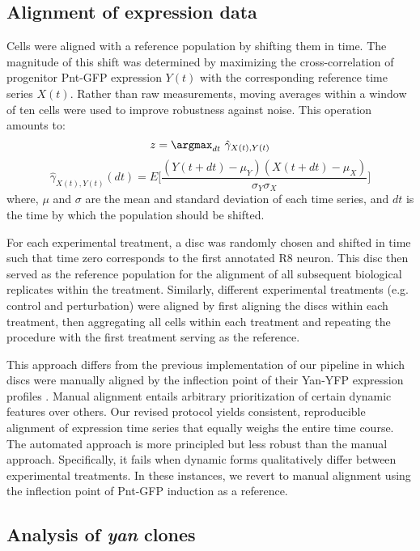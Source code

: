 \subsection{Alignment of expression data}
\label{appendix:methods:ratio:alignment}

Cells were aligned with a reference population by shifting them in time. The magnitude of this shift was determined by maximizing the cross-correlation of progenitor Pnt-GFP expression $Y(t)$ with the corresponding reference time series $X(t)$. Rather than raw measurements, moving averages within a window of ten cells were used to improve robustness against noise. This operation amounts to:
\begin{equation}
z = \argmax_{dt} \ {\hat{\gamma}_{X(t),Y(t)}}
\end{equation}
\begin{equation}
\hat{\gamma}_{X(t),Y(t)} (dt) = E \Big[ \frac{(Y(t+dt)-\mu_Y)(X(t+dt)-\mu_X)}{\sigma_Y \sigma_X} \Big]
\end{equation}
where, $\mu$ and $\sigma$ are the mean and standard deviation of each time series, and $dt$ is the time by which the population should be shifted.

For each experimental treatment, a disc was randomly chosen and shifted in time such that time zero corresponds to the first annotated R8 neuron. This disc then served as the reference population for the alignment of all subsequent biological replicates within the treatment. Similarly, different experimental treatments (e.g. control and perturbation) were aligned by first aligning the discs within each treatment, then aggregating all cells within each treatment and repeating the procedure with the first treatment serving as the reference.

This approach differs from the previous implementation of our pipeline in which discs were manually aligned by the inflection point of their Yan-YFP expression profiles \cite{Pelaez2015a}. Manual alignment entails arbitrary prioritization of certain dynamic features over others. Our revised protocol yields consistent, reproducible alignment of expression time series that equally weighs the entire time course. The automated approach is more principled but less robust than the manual approach. Specifically, it fails when dynamic forms qualitatively differ between experimental treatments. In these instances, we revert to manual alignment using the inflection point of Pnt-GFP induction as a reference.

\subsection{Analysis of \textit{yan} clones}
\label{appendix:methods:ratio:clones}

